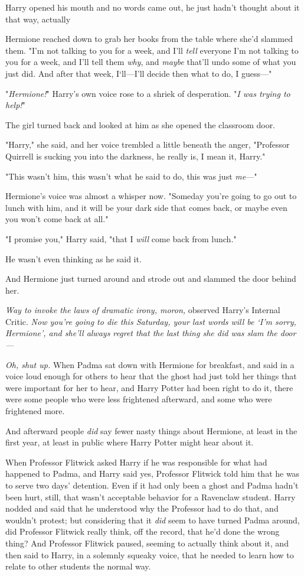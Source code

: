Harry opened his mouth and no words came out, he just{\el} hadn't thought
about it that way, actually{\el}

Hermione reached down to grab her books from the table where she'd slammed
them. "I'm not talking to you for a week, and I'll \emph{tell} everyone I'm not
talking to you for a week, and I'll tell them \emph{why}, and \emph{maybe}
that'll undo some of what you just did. And after that week, I`ll—I'll decide
then what to do, I guess—"

"\emph{Hermione!}" Harry's own voice rose to a shriek of desperation. "\emph{I
was trying to help!}"

The girl turned back and looked at him as she opened the classroom door.

"Harry," she said, and her voice trembled a little beneath the anger,
"Professor Quirrell is sucking you into the darkness, he really is, I mean it,
Harry."

"This{\el} wasn't him, this wasn't what he said to do, this was just
\emph{me}—"

Hermione's voice was almost a whisper now. "Someday you're going to go out to
lunch with him, and it will be your dark side that comes back, or maybe even
you won't come back at all."

"I promise you," Harry said, "that I \emph{will} come back from lunch."

He wasn't even thinking as he said it.

And Hermione just turned around and strode out and slammed the door behind her.

\emph{Way to invoke the laws of dramatic irony, moron,} observed Harry's
Internal Critic. \emph{Now you're going to die this Saturday, your last words
will be `I'm sorry, Hermione', and she'll always regret that the last thing she
did was slam the door—}

\emph{Oh, shut up.}
\sbreak
When Padma sat down with Hermione for breakfast, and said in a voice loud
enough for others to hear that the ghost had just told her things that were
important for her to hear, and Harry Potter had been right to do it, there were
some people who were less frightened afterward, and some who were frightened
more.

And afterward people \emph{did} say fewer nasty things about Hermione, at least
in the first year, at least in public where Harry Potter might hear about it.

When Professor Flitwick asked Harry if he was responsible for what had happened
to Padma, and Harry said yes, Professor Flitwick told him that he was to serve
two days' detention. Even if it had only been a ghost and Padma hadn't been
hurt, still, that wasn't acceptable behavior for a Ravenclaw student. Harry
nodded and said that he understood why the Professor had to do that, and
wouldn't protest; but considering that it \emph{did} seem to have turned Padma
around, did Professor Flitwick really think, off the record, that he'd done the
wrong thing? And Professor Flitwick paused, seeming to actually think about it,
and then said to Harry, in a solemnly squeaky voice, that he needed to learn
how to relate to other students the normal way.

